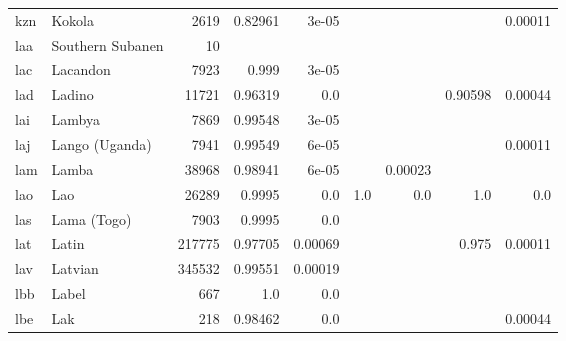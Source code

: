 \documentclass[11pt]{article}
\begin{document}
\begin{table*}[h]
{\begin{tabular}{llrrrrrrr}
kzn         & Kokola         & 2619         & 0.82961         & 3e-05         &          &          &          & 0.00011         \\

laa         & Southern Subanen         & 10         &          &          &          &          &          &          \\

lac         & Lacandon         & 7923         & 0.999         & 3e-05         &          &          &          &          \\

lad         & Ladino         & 11721         & 0.96319         & 0.0         &          &          & 0.90598         & 0.00044         \\

lai         & Lambya         & 7869         & 0.99548         & 3e-05         &          &          &          &          \\

laj         & Lango (Uganda)         & 7941         & 0.99549         & 6e-05         &          &          &          & 0.00011         \\

lam         & Lamba         & 38968         & 0.98941         & 6e-05         &          & 0.00023         &          &          \\

lao         & Lao         & 26289         & 0.9995         & 0.0         & 1.0         & 0.0         & 1.0         & 0.0         \\

las         & Lama (Togo)         & 7903         & 0.9995         & 0.0         &          &          &          &          \\

lat         & Latin         & 217775         & 0.97705         & 0.00069         &          &          & 0.975         & 0.00011         \\

lav         & Latvian         & 345532         & 0.99551         & 0.00019         &          &          &          &          \\

lbb         & Label         & 667         & 1.0         & 0.0         &          &          &          &          \\

lbe         & Lak         & 218         & 0.98462         & 0.0         &          &          &          & 0.00044         \\


\end{tabular}}
\end{table*}
\end{document}
